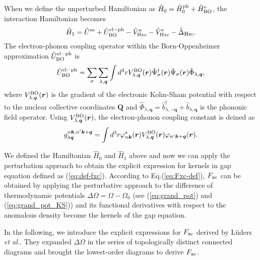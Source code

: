 When we define the unperturbed Hamiltonian as $\hat{H}_0 = \hat{H}^{\rm ph}_0 + \hat{H}^{\rm e}_{\rm BO}$,
the interaction Hamiltonian becomes
%
\begin{equation}
	\hat{H}_1 = \hat{U}^{\rm ee} + \hat{U}^{\rm el-ph}_{\rm BO} - \hat{V}^{\rm n}_{\rm Hxc}
	- \hat{V}^{\rm e}_{\rm Hxc} - \hat{\Delta}_{\rm Hxc}.
	\label{eq:int_Hamil}
\end{equation}
%
The electron-phonon coupling operator within the Born-Oppenheimer approximation
$\hat{U}^{\rm el-ph}_{\rm BO}$ is 
%
\begin{equation}
	\hat{U}^{\rm el-ph}_{\rm BO} = \sum_{\sigma} \sum_{\lambda,{\bm q}}
	\int d^3r V^{\rm BO}_{\lambda, {\bm q}}({\bm r})
	\hat{\Psi}^\dag_\sigma({\bm r}) \hat{\Psi}_\sigma({\bm r})
	\hat{\Phi}_{\lambda, {\bm q}},
	\label{eq:el-ph-coup-ope}
\end{equation}
%
where $V^{\rm BO}_{\lambda, {\bm q}}({\bm r})$ is the gradient of the electronic Kohn-Sham potential
with respect to the nuclear collective coordinates $\bm Q$ and 
$\hat{\Phi}_{\lambda, {\bm q}} = \hat{b}^\dag_{\lambda,-{\bm q}} + \hat{b}_{\lambda, {\bm q}}$ is the
phononic field operator.
Using $V^{\rm BO}_{\lambda, {\bm q}}({\bm r})$, the electron-phonon coupling constant is deined as 
%
\begin{equation}
	g^{n{\bm k},n'{\bm k}+{\bm q}}_{\lambda {\bm q}} = \int d^3r \varphi^\ast_{n{\bm k}}({\bm r})
	V^{\rm BO}_{\lambda, {\bm q}}({\bm r})\varphi_{n'{\bm k}+{\bm q}}({\bm r}).
	\label{eq:el-ph-coup-g}
\end{equation}
%

We defined the Hamiltonian $\hat{H}_0$ and $\hat{H}_1$ above and now we can apply the perturbation
approach to obtain the explicit expression for kernels in gap equation defined as
(\ref{eq:def-fxc}).
According to Eq.(\ref{eq:Fxc-def}),
$F_{\rm xc}$ can be obtained by applying the perturbative approach to the difference of 
thermodynamic potentials $\Delta\Omega = \Omega - \Omega_0$ 
(see (\ref{eq:grand_pot}) and (\ref{eq:grand_pot_KS}))
and its functional derivatives with respect to the anomalous density become the kernels of the 
gap equation.

In the following, we introduce the explicit expressions for $F_{\rm xc}$ derived by L\"{u}ders {\it et al.}\cite{Luders2005}.
They expanded $\Delta\Omega$ in the series of topologically distinct connected diagrams 
and brought the lowest-order diagrams to derive $F_{\rm xc}$.


